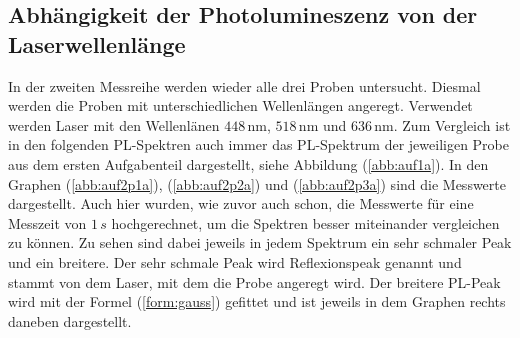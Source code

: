 \subsection{Abhängigkeit der Photolumineszenz von der Laserwellenlänge}
\label{sec:2}
In der zweiten Messreihe werden wieder alle drei Proben untersucht.
Diesmal werden die Proben mit unterschiedlichen Wellenl\"{a}ngen angeregt.
Verwendet werden Laser mit den Wellenl\"{a}nen $448 \,$nm, $518 \,$nm und $636 \,$nm.
Zum Vergleich ist in den folgenden PL-Spektren auch immer das PL-Spektrum der jeweiligen Probe aus dem ersten Aufgabenteil dargestellt, siehe Abbildung (\ref{abb:auf1a}).
In den Graphen (\ref{abb:auf2p1a}), (\ref{abb:auf2p2a}) und (\ref{abb:auf2p3a}) sind die Messwerte dargestellt.
Auch hier wurden, wie zuvor auch schon, die Messwerte f\"{u}r eine Messzeit von $1 \, s$ hochgerechnet, um die Spektren besser miteinander vergleichen zu k\"{o}nnen.
Zu sehen sind dabei jeweils in jedem Spektrum ein sehr schmaler Peak und ein breitere.
Der sehr schmale Peak wird Reflexionspeak genannt und stammt von dem Laser, mit dem die Probe angeregt wird.
Der breitere PL-Peak wird mit der Formel (\ref{form:gauss}) gefittet und ist jeweils in dem Graphen rechts daneben dargestellt.

